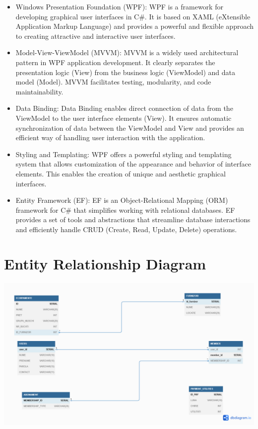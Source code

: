 \documentclass{article}
\begin{document}
\vspace{5pt}

\begin{itemize}
    \item Windows Presentation Foundation (WPF): WPF is a framework for developing graphical user interfaces in C\#. It is based on XAML (eXtensible Application Markup Language) and provides a powerful and flexible approach to creating attractive and interactive user interfaces.

    \item Model-View-ViewModel (MVVM): MVVM is a widely used architectural pattern in WPF application development. It clearly separates the presentation logic (View) from the business logic (ViewModel) and data model (Model). MVVM facilitates testing, modularity, and code maintainability.

    \item Data Binding: Data Binding enables direct connection of data from the ViewModel to the user interface elements (View). It ensures automatic synchronization of data between the ViewModel and View and provides an efficient way of handling user interaction with the application.

    \item Styling and Templating: WPF offers a powerful styling and templating system that allows customization of the appearance and behavior of interface elements. This enables the creation of unique and aesthetic graphical interfaces.

    \item Entity Framework (EF): EF is an Object-Relational Mapping (ORM) framework for C\# that simplifies working with relational databases. EF provides a set of tools and abstractions that streamline database interactions and efficiently handle CRUD (Create, Read, Update, Delete) operations.
\end{itemize}

\vspace{10pt}

\section{Entity Relationship Diagram}
\includegraphics[scale=0.3]{gymeerg.png}
\end{document}
